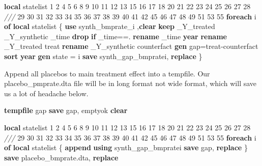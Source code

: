 \documentclass[
]{book}
\newenvironment{Shaded}{\begin{snugshade}}{\end{snugshade}}
\newcommand{\CommentTok}[1]{\textcolor[rgb]{0.56,0.35,0.01}{\textit{#1}}}
\newcommand{\FunctionTok}[1]{\textcolor[rgb]{0.13,0.29,0.53}{\textbf{#1}}}
\newcommand{\KeywordTok}[1]{\textcolor[rgb]{0.13,0.29,0.53}{\textbf{#1}}}
\newcommand{\NormalTok}[1]{#1}
\newcommand{\OtherTok}[1]{\textcolor[rgb]{0.56,0.35,0.01}{#1}}
\begin{document}
\begin{Shaded}
\begin{Highlighting}[]
\KeywordTok{local}\NormalTok{ statelist  1 2 4 5 6 8 9 10 11 12 13 15 16 17 18 20 21 22 23 24 25 26 27 28 }\CommentTok{///}
\NormalTok{                 29 30 31 32 33 34 35 36 37 38 39 40 41 42 45 46 47 48 49 51 53 55}
 \KeywordTok{foreach}\NormalTok{ i }\KeywordTok{of} \KeywordTok{local}\NormalTok{ statelist \{}
    \KeywordTok{use}\NormalTok{ synth\_bmprate\_}\OtherTok{\textasciigrave{}i\textquotesingle{}}\NormalTok{ ,}\KeywordTok{clear}
    \KeywordTok{keep}\NormalTok{ \_Y\_treated \_Y\_synthetic \_time}
    \KeywordTok{drop} \KeywordTok{if}\NormalTok{ \_time==.}
    \KeywordTok{rename}\NormalTok{ \_time }\FunctionTok{year}
    \KeywordTok{rename}\NormalTok{ \_Y\_treated  treat}
    \KeywordTok{rename}\NormalTok{ \_Y\_synthetic counterfact}
    \KeywordTok{gen}\NormalTok{ gap=treat{-}counterfact}
    \KeywordTok{sort} \FunctionTok{year} 
    \KeywordTok{gen}\NormalTok{ state = }\OtherTok{\textasciigrave{}i\textquotesingle{}}
    \KeywordTok{save}\NormalTok{ synth\_gap\_bmprate}\OtherTok{\textasciigrave{}i\textquotesingle{}}\NormalTok{, }\KeywordTok{replace}
\NormalTok{\}}
\end{Highlighting}
\end{Shaded}

Append all placebos to main treatment effect into a tempfile. Our placebo\_pmprate.dta file will be in long format not wide format, which will save us a lot of headache below.

\begin{Shaded}
\begin{Highlighting}[]
\KeywordTok{tempfile}\NormalTok{ gap}
\KeywordTok{save} \OtherTok{\textasciigrave{}gap\textquotesingle{}}\NormalTok{, emptyok}
\KeywordTok{clear}

\KeywordTok{local}\NormalTok{ statelist  1 2 4 5 6 8 9 10 11 12 13 15 16 17 18 20 21 22 23 24 25 26 27 28 }\CommentTok{///}
\NormalTok{                 29 30 31 32 33 34 35 36 37 38 39 40 41 42 45 46 47 48 49 51 53 55}
\KeywordTok{foreach}\NormalTok{ i }\KeywordTok{of} \KeywordTok{local}\NormalTok{ statelist \{}
    \KeywordTok{append} \KeywordTok{using}\NormalTok{ synth\_gap\_bmprate}\OtherTok{\textasciigrave{}i\textquotesingle{}}
    \KeywordTok{save} \OtherTok{\textasciigrave{}gap\textquotesingle{}}\NormalTok{, }\KeywordTok{replace} 
\NormalTok{\}}
\KeywordTok{save}\NormalTok{ placebo\_bmprate.dta, }\KeywordTok{replace}
\end{Highlighting}
\end{Shaded}
\end{document}
